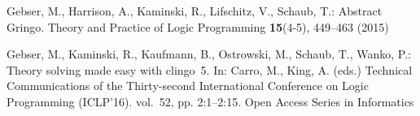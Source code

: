 \begin{thebibliography}{10}
\providecommand{\url}[1]{\texttt{#1}}
\providecommand{\urlprefix}{URL }
\providecommand{\doi}[1]{https://doi.org/#1}





  Gebser, M., Harrison, A., Kaminski, R., Lifschitz, V., Schaub, T.:
  Abstract {G}ringo. Theory and Practice of Logic Programming \textbf{15}(4-5), 449--463 (2015)


  Gebser, M., Kaminski, R., Kaufmann, B., Ostrowski, M., Schaub, T., Wanko, P.:
  Theory solving made easy with clingo~5. In: Carro, M., King, A. (eds.)
  Technical Communications of the Thirty-second International Conference on
  Logic Programming (ICLP'16). vol.~52, pp. 2:1--2:15. Open Access Series in
  Informatics%



\end{thebibliography}
